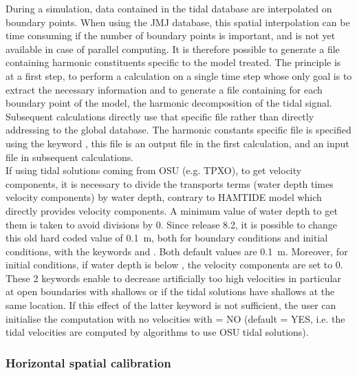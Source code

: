During a simulation, data contained in the tidal database are interpolated on
boundary points. When using the JMJ database, this spatial interpolation can
be time consuming if the number of boundary points is important, and is not yet
available in case of parallel computing. It is therefore possible to generate a
file containing harmonic constituents specific to the model treated. The
principle is at a first step, to perform a calculation on a single time step
whose only goal is to extract the necessary information and to generate a file
containing for each boundary point of the model, the harmonic decomposition of
the tidal signal. Subsequent calculations directly use that specific file
rather than directly addressing to the global database. The harmonic constants
specific file is specified using the keyword ,
this file is an output file in the first calculation, and an input file in
subsequent calculations.
\\

If using tidal solutions coming from OSU (e.g. TPXO), to get velocity
components, it is necessary to divide the transports terms
(water depth times velocity components) by water depth,
contrary to HAMTIDE model which directly provides velocity components.
A minimum value of water depth to get them is taken to avoid divisions by 0.
Since release 8.2, it is possible to change this old hard coded value of 0.1~m,
both for boundary conditions and initial conditions, with the keywords
 and
.
Both default values are 0.1~m.
Moreover, for initial conditions, if water depth is below
,
the velocity components are set to 0.
These 2 keywords enable to decrease artificially too high velocities
in particular at open boundaries with shallows or if the tidal solutions
have shallows at the same location.
If this effect of the latter keyword is not sufficient,
the user can initialise the computation with no velocities with
 = NO (default = YES, i.e. the
tidal velocities are computed by algorithms to use OSU tidal solutions).


\subsubsection{Horizontal spatial calibration}

